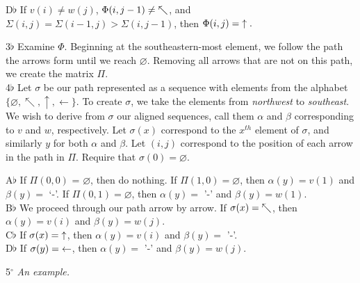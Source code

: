 \documentclass[a4paper]{article}
\begin{document}
\begin{adjustwidth}{.5in}{0pt}
\begin{adjustwidth}{.5in}{0pt}
D$\flat$ If $v(i) \neq w(j)$, $\Phi(i,j-1) \neq \hspace{1mm} \nwarrow$, and $\Sigma(i,j) = \Sigma(i-1,j) > \Sigma(i,j-1)$, then $\Phi(i,j) = \hspace{1mm} \uparrow. $ \\
\end{adjustwidth} 

3$\flat$ Examine $\Phi$. Beginning at the southeastern-most element, we follow the path the arrows form until we reach $\varnothing$. Removing all arrows that are not on this path, we create the matrix $\Pi$. \\

4$\flat$ Let $\sigma$ be our path represented as a sequence with elements from the alphabet $\{\varnothing, \nwarrow, \uparrow, \leftarrow\}$. To create $\sigma$, we take the elements from \emph{northwest} to \emph{southeast}. We wish to derive from $\sigma$ our aligned sequences, call them $\alpha$ and $\beta$ corresponding to $v$ and $w$, respectively. Let $\sigma(x)$ correspond to the $x^{th}$ element of $\sigma$, and similarly $y$ for both $\alpha$ and $\beta$. Let $(i,j)$ correspond to the position of each arrow in the path in $\Pi$. Require that $\sigma(0) = \varnothing$. \\

\begin{adjustwidth}{.5in}{0pt}
A$\flat$ If $\Pi(0,0)$ = $\varnothing$, then do nothing. If $\Pi(1,0) = \varnothing$, then $\alpha(y) = v(1)$ and $\beta(y) =$ `-'. If $\Pi(0,1) = \varnothing$, then $\alpha(y) =$ '-' and $\beta(y) = w(1)$. \\

B$\flat$ We proceed through our path arrow by arrow. If $\sigma(x) = \hspace{1mm} \nwarrow$, then $\alpha(y) = v(i)$ and $\beta(y) = w(j)$. \\

C$\flat$ If $\sigma(x) = \hspace{1mm} \uparrow$, then $\alpha(y) = v(i)$ and $\beta(y) =$ '-'. \\

D$\flat$ If $\sigma(y) = \hspace{1mm} \leftarrow$, then $\alpha(y) =$ '-' and $\beta(y) = w(j)$. \\
\end{adjustwidth}  
\end{adjustwidth} 

5$^\circ$ \emph{An example.} \\
\end{document}
